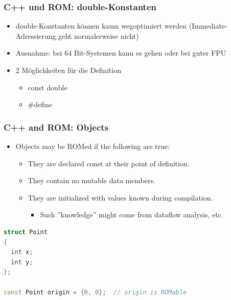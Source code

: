 \subsubsection{C++ und ROM: double-Konstanten}
\begin{itemize}
  \item double-Konstanten können kaum wegoptimiert werden (Immediate-Adressierung geht normalerweise nicht)
  \item Ausnahme: bei 64 Bit-Systemen kann es gehen oder bei guter FPU
  \item 2 Möglichkeiten für die Definition
  \begin{itemize}
    \item const double
    \item \#define
  \end{itemize}
\end{itemize}

\subsubsection{C++ and ROM: Objects}
\begin{itemize}
  \item Objects may be ROMed if the following are true:
  \begin{itemize}
    \item They are declared const at their point of definition.
    \item They contain no mutable data members.
    \item They are initialized with values known during compilation.
    \begin{itemize}
      \item Such ''knowledge'' might come from dataflow analysis, etc.
    \end{itemize}
  \end{itemize}
\end{itemize}
\begin{lstlisting}[language=C++]
struct Point
{
  int x;
  int y;
};

const Point origin = {0, 0};  // origin is ROMable
\end{lstlisting}

